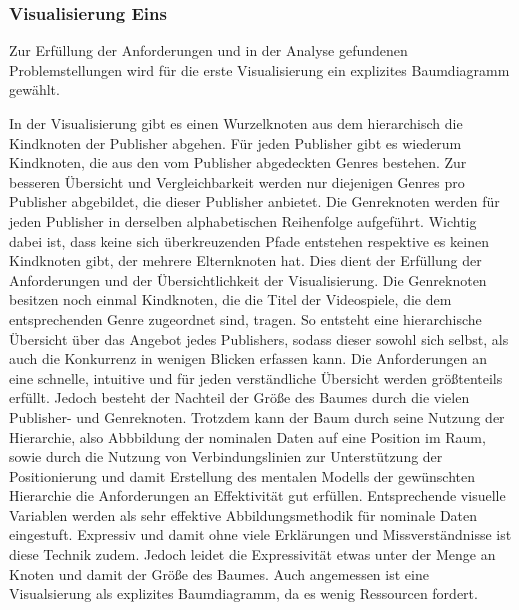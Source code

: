 \documentclass[usegeometry=true]{scrartcl}
\begin{document}
\subsubsection{Visualisierung Eins}
Zur Erfüllung der Anforderungen und in der Analyse gefundenen Problemstellungen wird für die erste Visualisierung ein explizites Baumdiagramm gewählt.

In der Visualisierung gibt es einen Wurzelknoten aus dem hierarchisch die Kindknoten der Publisher abgehen. 
Für jeden Publisher gibt es wiederum Kindknoten, die aus den vom Publisher abgedeckten Genres bestehen. 
Zur besseren Übersicht und Vergleichbarkeit werden nur diejenigen Genres pro Publisher abgebildet, die dieser Publisher anbietet. 
Die Genreknoten werden für jeden Publisher in derselben alphabetischen Reihenfolge aufgeführt. 
Wichtig dabei ist, dass keine sich überkreuzenden Pfade entstehen respektive es keinen Kindknoten gibt, der mehrere Elternknoten hat. 
Dies dient der Erfüllung der Anforderungen und der Übersichtlichkeit der Visualisierung.
Die Genreknoten besitzen noch einmal Kindknoten, die die Titel der Videospiele, die dem entsprechenden Genre zugeordnet sind, tragen. So entsteht eine hierarchische Übersicht über das Angebot jedes Publishers, sodass dieser sowohl sich selbst, als auch die Konkurrenz in wenigen Blicken erfassen kann. 
Die Anforderungen an eine schnelle, intuitive und für jeden verständliche Übersicht werden größtenteils erfüllt. 
Jedoch besteht der Nachteil der Größe des Baumes durch die vielen Publisher- und Genreknoten. 
Trotzdem kann der Baum durch seine Nutzung der Hierarchie, also Abbbildung der nominalen Daten auf eine Position im Raum, sowie durch die Nutzung von Verbindungslinien zur Unterstützung der Positionierung und damit Erstellung des mentalen Modells der gewünschten Hierarchie die Anforderungen an Effektivität gut erfüllen.
Entsprechende visuelle Variablen werden als sehr effektive Abbildungsmethodik für nominale Daten eingestuft. Expressiv und damit ohne viele Erklärungen und Missverständnisse ist diese Technik zudem. %
Jedoch leidet die Expressivität etwas unter der Menge an Knoten und damit der Größe des Baumes.
Auch angemessen ist eine Visualsierung als explizites Baumdiagramm, da es wenig Ressourcen fordert. 
\end{document}
